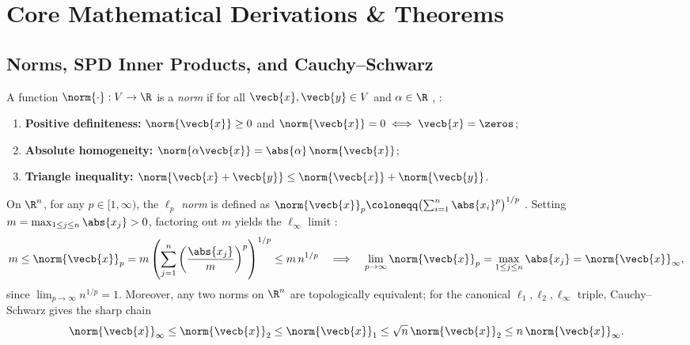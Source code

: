 \documentclass[../../../../master.tex]{subfiles}
\begin{document}
\section{Core Mathematical Derivations \& Theorems}
\label{sec:vecnorm:derivations}

\subsection{Norms, SPD Inner Products, and Cauchy--Schwarz}

\begin{coremath}
A function $\norm{\cdot} : V \to \R$ is a \emph{norm} if for all $\vecb{x}, \vecb{y} \in V$ and $\alpha \in \R$ , :
\begin{enumerate}[leftmargin=1.4em]
  \item \textbf{Positive definiteness:} $\norm{\vecb{x}} \ge 0$ and $\norm{\vecb{x}} = 0 \iff \vecb{x} = \zeros$;
  \item \textbf{Absolute homogeneity:} $\norm{\alpha \vecb{x}} = \abs{\alpha}\,\norm{\vecb{x}}$;
  \item \textbf{Triangle inequality:} $\norm{\vecb{x} + \vecb{y}} \le \norm{\vecb{x}} + \norm{\vecb{y}}$.
\end{enumerate}
On $\R^n$, for any $p \in [1, \infty)$, the \emph{$\ell_p$ norm} is defined as $\norm{\vecb{x}}_p \coloneqq \bigl(\sum_{i=1}^n \abs{x_i}^p\bigr)^{1/p}$ . Setting $m = \max_{1 \le j \le n} \abs{x_j} > 0$, factoring out $m$ yields the $\ell_\infty$ limit :
\begin{equation}
  m \le \norm{\vecb{x}}_p = m \left( \sum_{j=1}^n \left(\frac{\abs{x_j}}{m}\right)^p \right)^{1/p} \le m\, n^{1/p}
  \quad\Longrightarrow\quad
  \lim_{p \to \infty} \norm{\vecb{x}}_p = \max_{1 \le j \le n} \abs{x_j} = \norm{\vecb{x}}_\infty,
  \label{eq:vecnorm:linf_limit}
\end{equation}
since $\lim_{p\to\infty} n^{1/p} = 1$. Moreover, any two norms on $\R^n$ are topologically equivalent; for the canonical $\ell_1, \ell_2, \ell_\infty$ triple, Cauchy--Schwarz gives the sharp chain
\begin{equation}
  \norm{\vecb{x}}_\infty \le \norm{\vecb{x}}_2 \le \norm{\vecb{x}}_1 \le \sqrt{n}\,\norm{\vecb{x}}_2 \le n\,\norm{\vecb{x}}_\infty.
  \label{eq:vecnorm:norm_equiv}
\end{equation}


\end{coremath}
\end{document}
